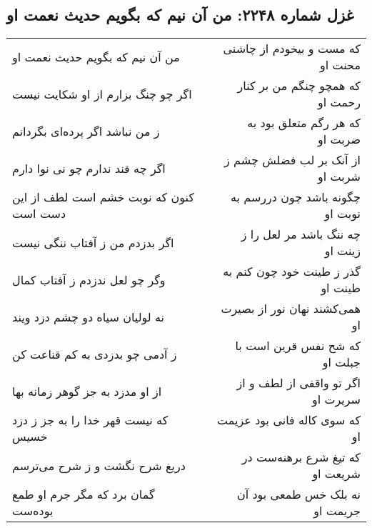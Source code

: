\begin{center}
\section*{غزل شماره ۲۲۴۸: من آن نیم که بگویم حدیث نعمت او}
\label{sec:2248}
\begin{longtable}{l p{0.5cm} r}
من آن نیم که بگویم حدیث نعمت او
&&
که مست و بیخودم از چاشنی محنت او
\\
اگر چو چنگ بزارم از او شکایت نیست
&&
که همچو چنگم من بر کنار رحمت او
\\
ز من نباشد اگر پرده‌ای بگردانم
&&
که هر رگم متعلق بود به ضربت او
\\
اگر چه قند ندارم چو نی نوا دارم
&&
از آنک بر لب فضلش چشم ز شربت او
\\
کنون که نوبت خشم است لطف از این دست است
&&
چگونه باشد چون دررسم به نوبت او
\\
اگر بدزدم من ز آفتاب ننگی نیست
&&
چه ننگ باشد مر لعل را ز زینت او
\\
وگر چو لعل ندزدم ز آفتاب کمال
&&
گذر ز طینت خود چون کنم به طینت او
\\
نه لولیان سیاه دو چشم دزد ویند
&&
همی‌کشند نهان نور از بصیرت او
\\
ز آدمی چو بدزدی به کم قناعت کن
&&
که شح نفس قرین است با جبلت او
\\
از او مدزد به جز گوهر زمانه بها
&&
اگر تو واقفی از لطف و از سریرت او
\\
که نیست قهر خدا را به جز ز دزد خسیس
&&
که سوی کاله فانی بود عزیمت او
\\
دریغ شرح نگشت و ز شرح می‌ترسم
&&
که تیغ شرع برهنه‌ست در شریعت او
\\
گمان برد که مگر جرم او طمع بوده‌ست
&&
نه بلک خس طمعی بود آن جریمت او
\\
\end{longtable}
\end{center}
